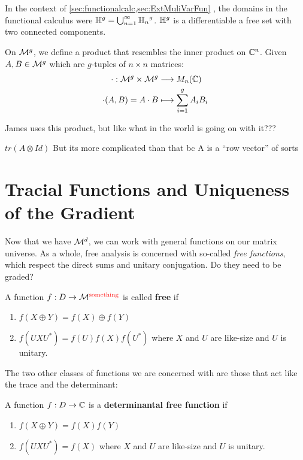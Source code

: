 In the context of \cref{sec:functionalcalc,sec:ExtMuliVarFun}
%
, the domains in the functional calculus were
\(\mathbb{H}^g = \bigcup_{n=1}^{\infty} {\mathbb{H}_n}^g\). \(\mathbb{H} ^g\) is a differentiable a
free set with two connected components.

On \(\mathcal{M}^{g} \), we define a product that resembles the inner product on
\(\mathbb{C}^n\). Given \(A,B \in \mathcal{M}^{g} \) which are \(g\)-tuples of \(n \times n\)
matrices:
\begin{align*}
	\cdot : \mathcal{M}^{g} \times \mathcal{M}^{g}  &\longrightarrow M_n(\mathbb{C}) \\
  \cdot (A,B) = A \cdot B &\longmapsto \sum_{i=1}^g A_i B_i
\end{align*}

{\color{red} James uses this product, but like what in the world is going on
  with it???}

{\color{red} \(tr (A \otimes Id)\) But its more complicated than that bc A is a
``row vector'' of sorts}


\section{Tracial Functions and Uniqueness of the Gradient}%
\label{sec:TracGrad}
Now that we have \(\mathcal{M}^d\), we can work with general functions on our matrix
universe. As a whole, free analysis is concerned with so-called \emph{free
  functions}, which respect the direct sums and unitary conjugation.
{\color{red} Do they need to be graded?}
\begin{definition}
\label{def:FreeFun}
  A function \(f: D\to \mathcal{M}^{\color{red} \text{something}}\) is called \textbf{free} if
  \begin{enumerate}
    \item \(f(X\oplus Y)= f(X) \oplus f(Y)\)
    \item \(f(U X U^*) = f(U)f(X)f(U^*)\) where \(X\) and \(U\) are like-size
          and \(U\) is unitary.
  \end{enumerate}
\end{definition}

The two other classes of functions we are concerned with are those that act like
the trace and the determinant:
\begin{definition}
  \label{def:DetFreeFun}
  A function \(f: D \to \mathbb{C} \) is a \textbf{determinantal free function} if
  \begin{enumerate}
    \item \(f(X\oplus Y) = f(X)f(Y)\)
    \item \(f(U X U^*) = f(X)\) where \(X\) and \(U\) are like-size
          and \(U\) is unitary.
  \end{enumerate}
\end{definition}


